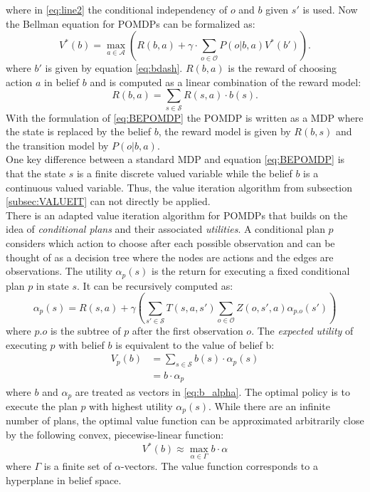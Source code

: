 %
where in \ref{eq:line2} the conditional independency of $o$ and $b$ given $s'$ is used. Now the Bellman equation for POMDPs can be formalized as:
%
\begin{equation}\label{eq:BEPOMDP}
    V^*(b) = \underset{a\in\mathcal{A}}{\max}\left( R(b,a) + \gamma\cdot \sum_{o\in\mathcal{O}} P(o|b,a)V^*(b') \right).
\end{equation}
%
where $b'$ is given by equation \ref{eq:bdash}. $R(b,a)$ is the reward of choosing action $a$ in belief $b$ and is computed as a linear combination of the reward model:
%
\begin{equation}\label{eq:R_b}
    R(b,a) = \sum_{s\in\mathcal{S}}R(s,a)\cdot b(s).
\end{equation}
%
With the formulation of \ref{eq:BEPOMDP} the POMDP is written as a MDP where the state is replaced by the belief $b$, the reward model is given by $R(b,s)$ and the transition model by $P(o|b,a)$.\\

One key difference between a standard MDP and equation \ref{eq:BEPOMDP} is that the state $s$ is a finite discrete valued variable while the belief $b$ is a continuous valued variable. Thus, the value iteration algorithm from subsection \ref{subsec:VALUEIT} can not directly be applied.\\

There is an adapted value iteration algorithm for POMDPs that builds on the idea of \textit{conditional plans} and their associated \textit{utilities}. A conditional plan $p$ considers which action to choose after each possible observation and can be thought of as a decision tree where the nodes are actions and the edges are observations.
The utility $\alpha_p(s)$ is the return for executing a fixed conditional plan $p$ in state $s$. It can be recursively computed as:
\begin{equation}\label{eq:POMDP_valit}
    \alpha_p(s) = R(s,a) + \gamma\left(\sum_{s'\in\mathcal{S}}T(s,a,s')\sum_{o\in\mathcal{O}}Z(o, s', a)\alpha_{p.o}(s')\right)
\end{equation}
where $p.o$ is the subtree of $p$ after the first observation $o$. The \textit{expected utility} of executing $p$ with belief $b$ is equivalent to the value of belief b:
\begin{align}
        V_p(b) &= \sum_{s\in\mathcal{S}}b(s)\cdot \alpha_p(s)\\
        &=\label{eq:b_alpha} b\cdot \alpha_p
\end{align}
where $b$ and $\alpha_p$ are treated as vectors in \ref{eq:b_alpha}. The optimal policy is to execute the plan $p$ with highest utility $\alpha_p(s)$. While there are an infinite number of plans, the optimal value function can be approximated arbitrarily close by the following convex, piecewise-linear function:
%
\begin{equation}\label{eq:Vstarbalpha}
    V^*(b) \approx \max_{\alpha\in\Gamma} b\cdot \alpha
\end{equation}
%
where $\Gamma$ is a finite set of $\alpha$-vectors. The value function corresponds to a hyperplane in belief space.\\

